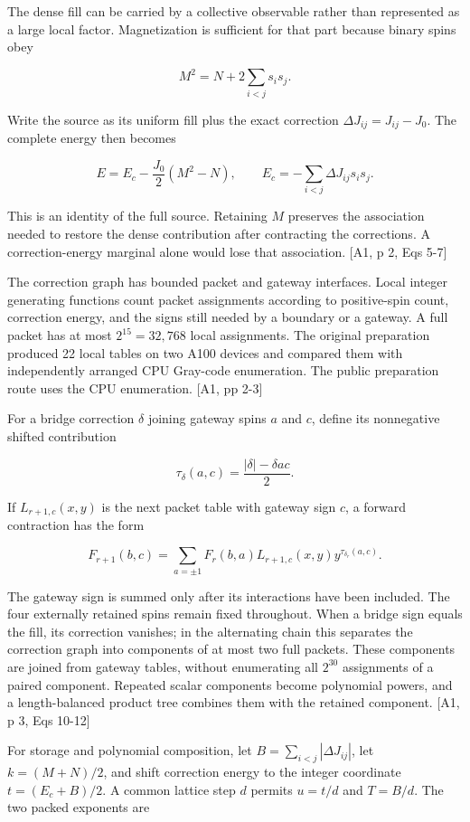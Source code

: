 The dense fill can be carried by a collective observable rather than represented as a large local factor. Magnetization is sufficient for that part because binary spins obey

\[M^2=N+2\sum_{i<j}s_i s_j.\]

Write the source as its uniform fill plus the exact correction \(\Delta J_{ij}=J_{ij}-J_0\). The complete energy then becomes

\[E=E_c-\frac{J_0}{2}(M^2-N),\qquad E_c=-\sum_{i<j}\Delta J_{ij}s_i s_j.\]

This is an identity of the full source. Retaining \(M\) preserves the association needed to restore the dense contribution after contracting the corrections. A correction-energy marginal alone would lose that association. {[}A1, p 2, Eqs 5-7{]}

The correction graph has bounded packet and gateway interfaces. Local integer generating functions count packet assignments according to positive-spin count, correction energy, and the signs still needed by a boundary or a gateway. A full packet has at most \(2^{15}=32,768\) local assignments. The original preparation produced 22 local tables on two A100 devices and compared them with independently arranged CPU Gray-code enumeration. The public preparation route uses the CPU enumeration. {[}A1, pp 2-3{]}

For a bridge correction \(\delta\) joining gateway spins \(a\) and \(c\), define its nonnegative shifted contribution

\[\tau_\delta(a,c)=\frac{|\delta|-\delta ac}{2}.\]

If \(L_{r+1,c}(x,y)\) is the next packet table with gateway sign \(c\), a forward contraction has the form

\[F_{r+1}(b,c)=\sum_{a=\pm1}F_r(b,a)L_{r+1,c}(x,y)y^{\tau_{\delta_r}(a,c)}.\]

The gateway sign is summed only after its interactions have been included. The four externally retained spins remain fixed throughout. When a bridge sign equals the fill, its correction vanishes; in the alternating chain this separates the correction graph into components of at most two full packets. These components are joined from gateway tables, without enumerating all \(2^{30}\) assignments of a paired component. Repeated scalar components become polynomial powers, and a length-balanced product tree combines them with the retained component. {[}A1, p 3, Eqs 10-12{]}

For storage and polynomial composition, let \(B=\sum_{i<j}|\Delta J_{ij}|\), let \(k=(M+N)/2\), and shift correction energy to the integer coordinate \(t=(E_c+B)/2\). A common lattice step \(d\) permits \(u=t/d\) and \(T=B/d\). The two packed exponents are


